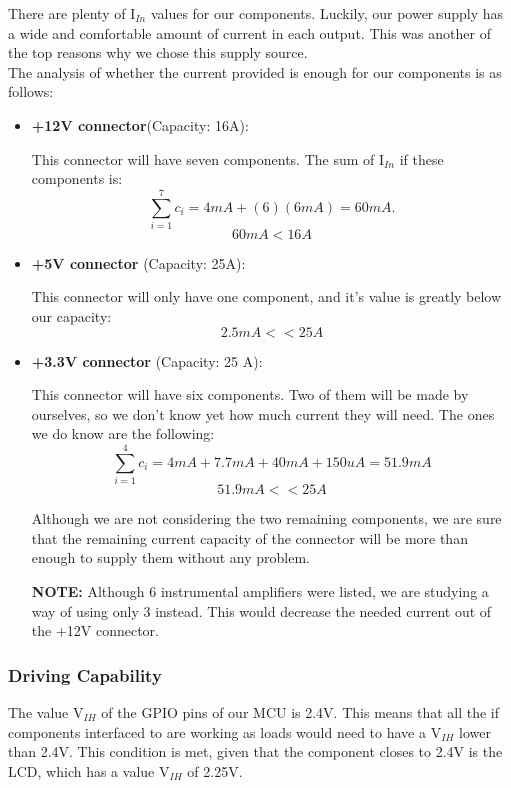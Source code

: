 			There are plenty of I$_{In}$ values for our components. Luckily, our power supply has a wide and comfortable amount of current in each output. This was another of the top reasons why we chose this supply source. \\

			The analysis of whether the current provided is enough for our components is as follows:

			\begin{itemize}
			  \item \textbf{+12V connector}(Capacity: 16A):
			  
			  This connector will have seven components. The sum of I$_{In}$ if these components is: $$ \sum_{i=1}^{7} c_i = 4mA + (6)(6mA) = 60mA. $$ $$60 mA < 16A $$ 
			  \item \textbf{+5V connector} (Capacity: 25A):
			  
			  This connector will only have one component, and it's value is greatly below our capacity: $$2.5 mA << 25A $$ 
			  
			  \item \textbf{+3.3V connector} (Capacity: 25 A):
			  
			  This connector will have six components. Two of them will be made by ourselves, so we don't know yet how much current they will need. The ones we do know are the following: $$\sum_{i=1}^{4} c_i = 4mA + 7.7 mA + 40 mA + 150 uA = 51.9 mA $$  $$51.9mA << 25A$$
			  
			  Although we are not considering the two remaining components, we are sure that the remaining current capacity of the connector will be more than enough to supply them without any problem.
			  
			  \textbf{NOTE:} Although 6 instrumental amplifiers were listed, we are studying a way of using only 3 instead. This would decrease the needed current out of the +12V connector.
			\end{itemize} 


		\subsubsection{Driving Capability}
			The value V$_{IH}$ of the GPIO pins of our MCU is 2.4V. This means that all the if components interfaced to are working as loads would need to have a V$_{IH}$ lower than 2.4V. This condition is met, given that the component closes to 2.4V is the LCD, which has a value V$_{IH}$ of 2.25V. \\

